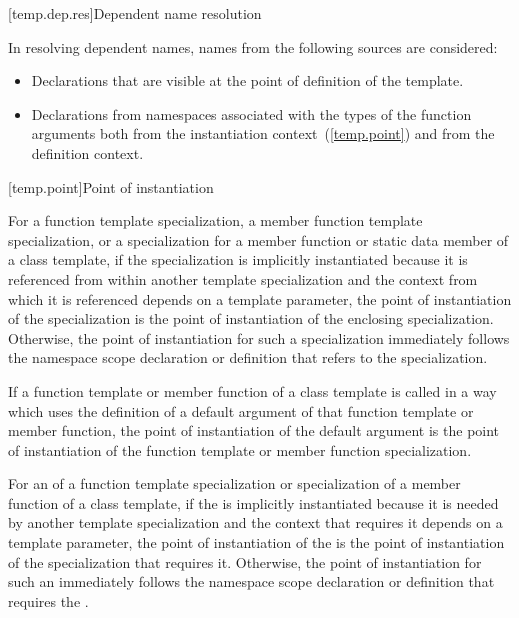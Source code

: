 [temp.dep.res]{Dependent name resolution}

\pnum
{}%
In resolving dependent names, names from the following sources are considered:

\begin{itemize}
\item
Declarations that are visible at the point of definition of the
template.
\item
Declarations from namespaces associated with the types of the
function arguments both from the instantiation context~(\ref{temp.point})
and from the definition context.
\end{itemize}

[temp.point]{Point of instantiation}

\pnum
{}%
For a function template specialization, a member function template
specialization, or a specialization for a member function or static data member
of a class template,
if the specialization is implicitly instantiated because it is referenced
from within another template specialization and
the context from which it is referenced depends on a template parameter,
the point of instantiation of the specialization is the point of instantiation
of the enclosing specialization.
Otherwise, the point of instantiation for such a specialization immediately
follows the namespace scope declaration
or definition that refers to the specialization.

\pnum
If a function template or member function of a class template is called
in a way which uses the definition of a default argument of that function
template or member function,
the point of instantiation of the default argument is the point of
instantiation of the function template or member function specialization.

\pnum
For an  of a function template
specialization or specialization of a member function of a class template, if
the  is implicitly instantiated because
it is needed by another template specialization and the context that requires
it depends on a template parameter, the point of instantiation of the
 is the point of instantiation of the
specialization that requires it. Otherwise, the point of instantiation for such
an  immediately follows the namespace
scope declaration or definition that requires the
.



